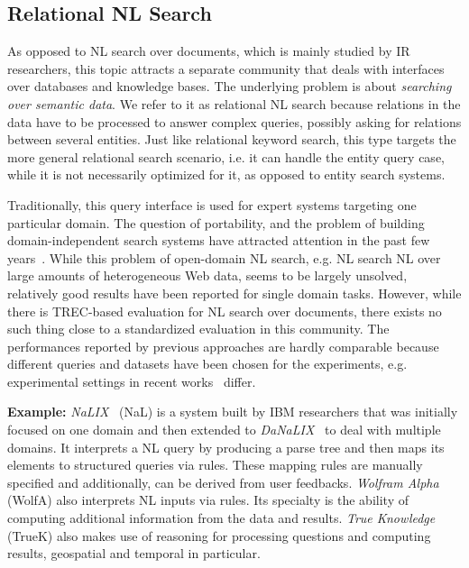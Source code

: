 \subsection{Relational NL Search} As opposed to NL search over documents, which is mainly studied by IR researchers, this topic attracts a separate community that deals with interfaces over databases and knowledge bases. The underlying problem is about \emph{searching over semantic data}. We refer to it as relational NL search because relations in the data have to be processed to answer complex queries, possibly asking for relations between several entities. Just like relational keyword search, this type targets the more general relational search scenario, i.e. it can handle the entity query case, while it is not necessarily optimized for it, as opposed to entity search systems.  

Traditionally, this query interface is used for expert systems targeting one particular domain.  The question of portability, and the problem of building domain-independent search systems have attracted attention in the past few years~\cite{DBLP:conf/esws/WangXZY07,DBLP:journals/dke/CimianoHHMS08,DBLP:conf/aaai/LiCYSJ07}. While this problem of open-domain NL search, e.g. NL search NL over large amounts of heterogeneous Web data, seems to be largely unsolved, relatively good results have been reported for single domain tasks. However, while there is TREC-based evaluation for NL search over documents, there exists no such thing close to a standardized evaluation in this community. The performances reported by previous approaches are hardly comparable because different queries and datasets have been chosen for the experiments, e.g. experimental settings in recent works~\cite{DBLP:conf/esws/DamljanovicAC10,DBLP:conf/iui/HanNPPL10,DBLP:journals/tods/LiYJ07} differ. 

\textbf{Example:} \emph{NaLIX}~\cite{DBLP:journals/tods/LiYJ07} (NaL) is a system built by IBM researchers that was initially focused on one domain and then extended to \emph{DaNaLIX}~\cite{DBLP:conf/aaai/LiCYSJ07} to deal with multiple domains. It interprets a NL query by producing a parse tree and then maps its elements to structured queries via rules. These mapping rules are manually specified and additionally, can be derived from user feedbacks. \emph{Wolfram Alpha} (WolfA) also interprets NL inputs via rules. Its specialty is the ability of computing additional information from the data and results. \emph{True Knowledge} (TrueK) also makes use of reasoning for processing questions and computing results, geospatial and temporal in particular. 



